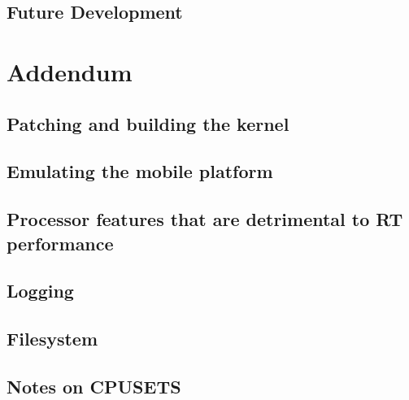 \documentclass[a4paper,12pt]{report}
\begin{document}
\section{Future Development}

\newpage
\chapter{Addendum}
\section{Patching and building the kernel}
\section{Emulating the mobile platform}
\section{Processor features that are detrimental to RT performance}
\section{Logging}
\section{Filesystem}
\section{Notes on CPUSETS} %



\end{document}
